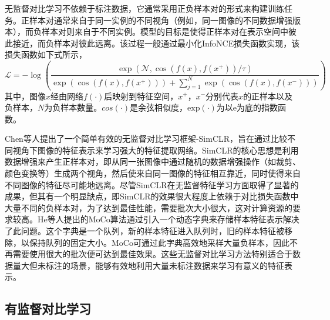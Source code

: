 无监督对比学习不依赖于标注数据，它通常采用正负样本对的形式来构建训练任务。正样本对通常来自于同一实例的不同视角（例如，同一图像的不同数据增强版本），而负样本对则来自于不同实例。模型的目标是使得正样本对在表示空间中彼此接近，而负样本对彼此远离。该过程一般通过最小化InfoNCE损失函数实现，该损失函数如下式所示，
\begin{equation}
  \label{equation2: infoNCE}
  \mathcal{L} = - \log \left( \frac{\exp \left( \mathcal{N}, \cos(f(x), f(x^+)) / \tau \right)}{\exp \left( \cos(f(x), f(x^+)) \right) + \sum_{j=1}^{N} \exp \left( \cos(f(x), f(x^-)) \right)} \right)
\end{equation}
其中，图像$x$经由网络$f(\cdot)$后映射到特征空间，$x^+$，$x^-$分别代表$x$的正样本以及负样本，$N$为负样本数量。$cos(\cdot)$是余弦相似度，$\text{exp}(\cdot)$为以e为底的指数函数。

Chen等人\cite{SimCLR}提出了一个简单有效的无监督对比学习框架-SimCLR，旨在通过比较不同视角下图像的特征表示来学习强大的特征提取网络。SimCLR的核心思想是利用数据增强来产生正样本对，即从同一张图像中通过随机的数据增强操作（如裁剪、颜色变换等）生成两个视角，然后使来自同一图像的特征相互靠近，同时使得来自不同图像的特征尽可能地远离。尽管SimCLR在无监督特征学习方面取得了显著的成果，但其有一个明显缺点，即SimCLR的效果很大程度上依赖于对比损失函数中大量不同的负样本对，为了达到最佳性能，需要批次大小很大，这对计算资源的要求较高。He等人\cite{MoCo}提出的MoCo算法通过引入一个动态字典来存储样本特征表示解决了此问题。这个字典是一个队列，新的样本特征进入队列时，旧的样本特征被移除，以保持队列的固定大小。MoCo可通过此字典高效地采样大量负样本，因此不再需要使用很大的批次便可达到最佳效果。这些无监督对比学习方法特别适合于数据量大但未标注的场景，能够有效地利用大量未标注数据来学习有意义的特征表示。


\subsection[\hspace{-2pt}有监督对比学习]{{\heiti{} \hspace{-8pt}有监督对比学习}}\label{section2: 有监督对比学习}

